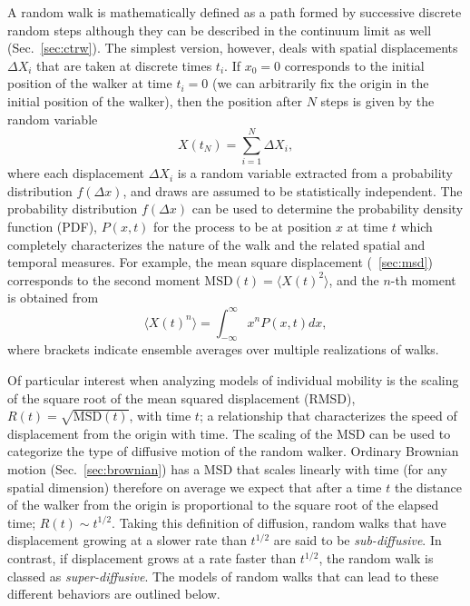 A random walk is mathematically defined as a path formed by successive discrete random steps although they can be described in the continuum limit as well  (Sec.~\ref{sec:ctrw}). The simplest version, however, deals with spatial displacements $\Delta X_{i}$ that are taken at discrete times $t_i$. If $x_0 = 0$ corresponds to the initial position of the walker at time $t_i=0$ (we can arbitrarily fix the origin in the initial position of the walker), then the position after $N$ steps is given by the random variable
\begin{equation}
X(t_N) = \sum_{i=1}^{N} \Delta X_{i},
\end{equation}  
where each displacement $\Delta X_{i}$ is a random variable extracted from a probability distribution $f(\Delta x )$,   
and draws are assumed to be statistically independent. The probability distribution $f(\Delta x)$ can be used to determine the probability density function (PDF), $P(x,t)$ for the process to be at position $x$ at time $t$ which completely characterizes the nature of the walk and the related spatial and temporal measures. For example, the mean square displacement (\sectionname ~\ref{sec:msd}) corresponds to the second moment $\mathrm{MSD}(t) = \langle X(t)^2 \rangle$, 
and the $n$-th moment is obtained from
\begin{equation}
\langle X(t)^n \rangle = \int_{-\infty}^{\infty} x^n P(x,t) d x, \label{individual:moment}
\end{equation}
where brackets indicate ensemble averages over multiple realizations of walks.

Of particular interest when analyzing models of individual mobility is the scaling of the square root of the mean squared displacement (RMSD), $R(t) = \sqrt{\mathrm{MSD}(t)}$, with time $t$; a relationship that characterizes the speed of displacement from the origin with time. The scaling of the MSD can be used to categorize the type of diffusive motion of the random walker. Ordinary Brownian motion (Sec.~\ref{sec:brownian}) has a MSD that scales linearly with time (for any spatial dimension) therefore on average we expect that after a time $t$ the distance of the walker from the origin is proportional to the square root of the elapsed time; 
$R(t) \sim t^{1/2}$. Taking this definition of diffusion, random walks that have displacement growing at a slower rate than $t^{1/2}$ are said to be {\it sub-diffusive}. In contrast, if displacement grows at a rate faster than $t^{1/2}$, the random walk is classed as {\it super-diffusive}. The models of random walks that can lead to these different behaviors are outlined below. 

